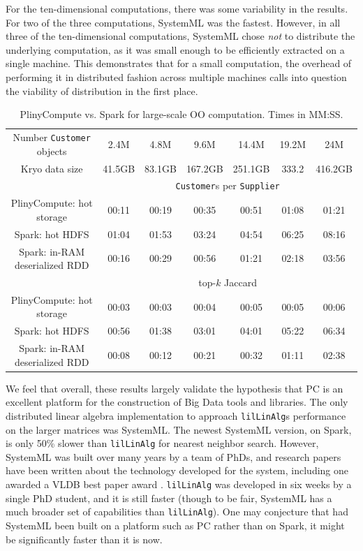 For the ten-dimensional computations, there was some variability in the results.
For two of the three computations, 
SystemML was the fastest.  However, in all three of the ten-dimensional computations, SystemML chose
\emph{not} to distribute the underlying computation, as it was small enough to be efficiently extracted
on a single machine.  This demonstrates that for a small computation, the overhead of performing it in 
distributed fashion across multiple machines calls into question the viability of distribution in the first place.


\begin{table}[t]
\small
\begin{center}
\begin{tabular}{|c||c|c|c|c|c|c|}
\hline
Number \texttt{Customer} objects &2.4M & 4.8M & 9.6M  & 14.4M & 19.2M & 24M \\
Kryo data size &41.5GB & 83.1GB & 167.2GB &251.1GB &333.2 &416.2GB \\
\hline
& \multicolumn{6}{c|}{\texttt{Customer}s per \texttt{Supplier}} \\
\hline
PlinyCompute: hot storage & 00:11&	00:19&	00:35&	00:51&	01:08&	01:21 \\
Spark: hot HDFS & 01:04&	01:53&	03:24&	04:54&	06:25&	08:16\\
Spark: in-RAM deserialized RDD & 00:16& 	00:29& 	00:56& 	01:21& 	02:18& 	03:56\\
\hline
& \multicolumn{6}{c|}{top-$k$ Jaccard} \\
\hline
PlinyCompute: hot storage & 00:03&	00:03&	00:04&	00:05&	00:05&	00:06 \\
Spark: hot HDFS & 00:56&	01:38&	03:01 & 04:01&	05:22&	06:34\\
Spark: in-RAM deserialized RDD & 00:08& 	00:12& 	00:21 & 00:32& 	01:11& 	02:38\\
\hline
\end{tabular}
\caption{PlinyCompute vs. Spark for large-scale OO computation. Times in MM:SS.}
\label{fig:TPC}
\end{center}
\vspace{-20pt}
\end{table}

We feel that overall, these results largely validate the hypothesis that PC is an excellent platform for the 
construction of Big Data tools and libraries.  The only distributed linear algebra implementation
to approach \texttt{lilLinAlg}s performance on the larger matrices
was SystemML.  The newest SystemML version, on Spark, is only 50\% slower than \texttt{lilLinAlg} for nearest neighbor search.
However,
SystemML was built over many years by a team of PhDs, and research papers have been written about the
technology developed for the system, including one awarded a VLDB best paper award \cite{boehm2016systemml}.
\texttt{lilLinAlg} was developed in six weeks by a single PhD student, and it is still
faster (though to be fair, SystemML has a much broader
set of capabilities than \texttt{lilLinAlg}).
One may conjecture that had SystemML been built on a platform such as PC rather than on Spark, it might be significantly
faster than it is now.

